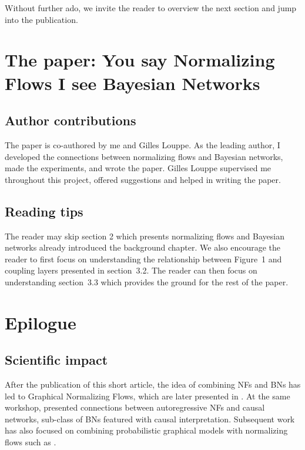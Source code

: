 Without further ado, we invite the reader to overview the next section and jump into the publication.
\section{The paper: You say Normalizing Flows I see Bayesian Networks}

\subsection{Author contributions}
The paper is co-authored by me and Gilles Louppe. As the leading author, I developed the connections between normalizing flows and Bayesian networks, made the experiments, and wrote the paper. Gilles Louppe supervised me throughout this project, offered suggestions and helped in writing the paper.

\subsection{Reading tips}
The reader may skip section 2 which presents normalizing flows and Bayesian networks already introduced the background chapter. We also encourage the reader to first focus on understanding the relationship between Figure~1 and coupling layers presented in section~3.2. The reader can then focus on understanding section~3.3 which provides the ground for the rest of the paper.


\section{Epilogue}
\subsection{Scientific impact}
After the publication of this short article, the idea of combining NFs and BNs has led to Graphical Normalizing Flows, which are later presented in . At the same workshop, \citet{khemakhem_causal_2020} presented connections between autoregressive NFs and causal networks, sub-class of BNs featured with causal interpretation. Subsequent work has also focused on combining probabilistic graphical models with normalizing flows such as \citet{mouton2022graphical, mouton2022siren}.

